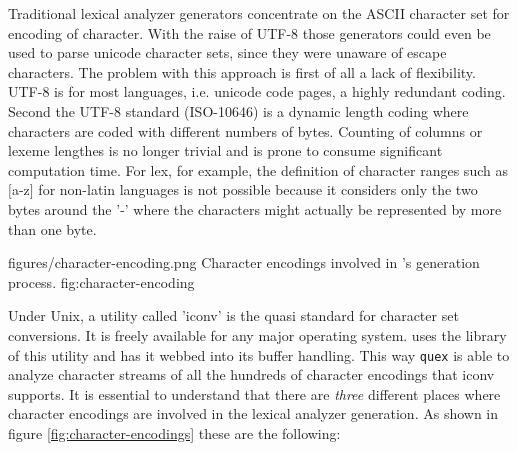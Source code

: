 Traditional lexical analyzer generators concentrate on the ASCII \cite{}
character set for encoding of character. With the raise of UTF-8 \cite{} those
generators could even be used to parse unicode character sets, since they were
unaware of escape characters.   The
problem with this approach is first of all a lack of flexibility.  UTF-8 is for
most languages, i.e. unicode code pages, a highly redundant coding. Second the
UTF-8 standard (ISO-10646) is a dynamic length coding where characters are
coded with different numbers of bytes.  Counting of columns or lexeme lengthes
is no longer trivial and is prone to consume significant computation time. 
For lex, for example, the definition of character ranges such as
$[$a-z$]$ for non-latin languages is not possible because it considers
only the two bytes around the '-' where the characters might actually be
represented by more than one byte.

\showpic
{figures/character-encoding.png}
{Character encodings involved in {\quex}'s generation process.}
{fig:character-encoding}

Under Unix, a utility called 'iconv' \cite{} is the quasi standard for
character set conversions. It is freely available for any major operating
system.  {\Quex} uses the library of this utility and has it webbed into its
buffer handling. This way {\tt quex} is able to analyze character streams of
all the hundreds of character encodings that iconv supports. It is essential to
understand that there are {\it three} different places where character
encodings are involved in the lexical analyzer generation. As shown in figure
\ref{fig:character-encodings} these are the following:

